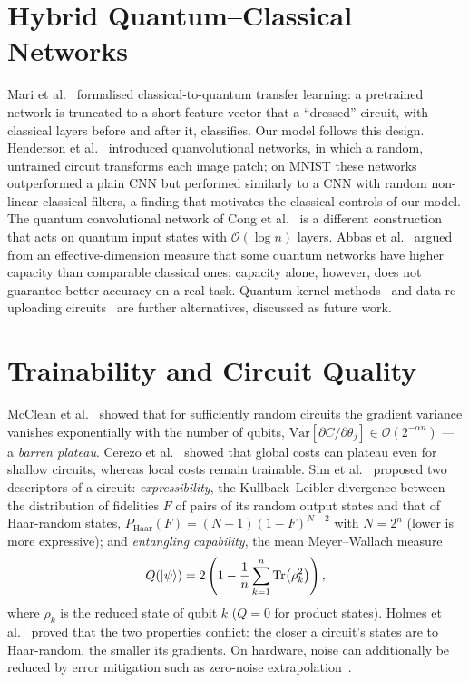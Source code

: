 \section{Hybrid Quantum--Classical Networks}
\label{sec:rw_hybrid}
Mari et al.~\cite{mari2020} formalised classical-to-quantum transfer
learning: a pretrained network is truncated to a short feature vector that
a ``dressed'' circuit, with classical layers before and after it,
classifies. Our \cq{} model follows this design. Henderson et
al.~\cite{henderson2020} introduced quanvolutional networks, in which a
random, untrained circuit transforms each image patch; on MNIST these
networks outperformed a plain CNN but performed similarly to a CNN with
random non-linear classical filters, a finding that motivates the
classical controls of our \qc{} model. The quantum convolutional network of
Cong et al.~\cite{cong2019} is a different construction that acts on
quantum input states with $\mathcal{O}(\log n)$ layers. Abbas et
al.~\cite{abbas2021} argued from an effective-dimension measure that some
quantum networks have higher capacity than comparable classical ones;
capacity alone, however, does not guarantee better accuracy on a real task.
Quantum kernel methods~\cite{havlicek2019} and data re-uploading
circuits~\cite{perezsalinas2020} are further alternatives, discussed as
future work.

\section{Trainability and Circuit Quality}
\label{sec:rw_quality}
McClean et al.~\cite{mcclean2018} showed that for sufficiently random
circuits the gradient variance vanishes exponentially with the number of
qubits, $\mathrm{Var}[\partial C/\partial\theta_j] \in \mathcal{O}(2^{-\alpha
n})$ --- a \emph{barren plateau}. Cerezo et al.~\cite{cerezo2021} showed that
global costs can plateau even for shallow circuits, whereas local costs
remain trainable. Sim et al.~\cite{sim2019} proposed two descriptors of a
circuit: \emph{expressibility}, the Kullback--Leibler divergence between the
distribution of fidelities $F$ of pairs of its random output states and that
of Haar-random states, $P_{\mathrm{Haar}}(F) = (N-1)(1-F)^{N-2}$ with $N =
2^n$ (lower is more expressive); and \emph{entangling capability}, the mean
Meyer--Wallach measure~\cite{meyer2002}
\begin{equation}
Q(\left|\psi\right\rangle) = 2\left(1 - \frac{1}{n}\sum_{k=1}^{n}\mathrm{Tr}\!\left(\rho_k^2\right)\right),
\end{equation}
where $\rho_k$ is the reduced state of qubit $k$ ($Q = 0$ for product
states). Holmes et al.~\cite{holmes2022} proved that the two properties
conflict: the closer a circuit's states are to Haar-random, the smaller its
gradients. On hardware, noise can additionally be reduced by error
mitigation such as zero-noise extrapolation~\cite{temme2017}.

